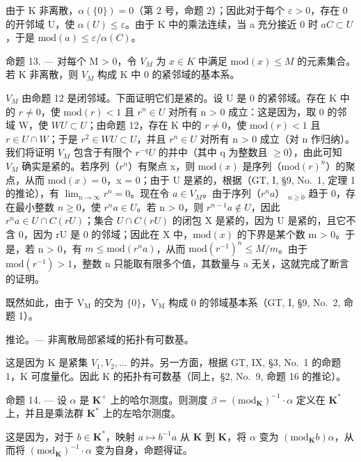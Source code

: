 由于 K 非离散，\(\alpha(\{0\}) = 0\)（第 2 号，命题 2）；因此对于每个 \(\varepsilon > 0\)，存在 0 的开邻域 U，使 \(\alpha(U) \leqslant \varepsilon\)。由于 K 中的乘法连续，当 a 充分接近 0 时 \(aC \subset U\)，于是 \(\text{mod}(a) \leqslant \varepsilon / \alpha(C)\)。

命题 13. --- 对每个 M \textgreater{} 0，令 \(V_{M}\) 为 \(x \in K\) 中满足 \(\text{mod}(x) \leqslant M\) 的元素集合。若 K 非离散，则 \(V_{M}\) 构成 K 中 0 的紧邻域的基本系。

\(V_{M}\) 由命题 12 是闭邻域。下面证明它们是紧的。设 U 是 0 的紧邻域。存在 K 中的 \(r \neq 0\)，使 \(\text{mod}(r) < 1\) 且 \(r^{n} \in U\) 对所有 n \textgreater{} 0 成立：这是因为，取 0 的邻域 W，使 \(WU \subset U\)；由命题 12，存在 K 中的 \(r \neq 0\)，使 \(\text{mod}(r) < 1\) 且 \(r \in U \cap W\)；于是 \(r^{2} \in WU \subset U\)，并且 \(r^{n} \in U\) 对所有 n \textgreater{} 0 成立（对 n 作归纳）。我们将证明 \(V_{M}\) 包含于有限个 \(r^{-q}U\) 的并中（其中 q 为整数且 \(\geqslant 0\)），由此可知 \(V_{M}\) 确实是紧的。若序列（\(r^{n}\)）有聚点 x，则 \(\text{mod}(x)\) 是序列（\(\text{mod}(r)^{n}\)）的聚点，从而 \(\text{mod}(x) = 0\)，x = 0；由于 U 是紧的，根据（GT, I, §9, No.~1, 定理 1 的推论），有 \(\lim_{n \to \infty} r^{n} = 0\)。现在令 \(a \in V_{M}\)。由于序列（\(r^{n}a\)） \(_{n \geqslant 0}\) 趋于 0，存在最小整数 \(n \geqslant 0\)，使 \(r^{n}a \in U\)。若 n \textgreater{} 0，则 \(r^{n-1}a \notin U\)，因此 \(r^{n}a \in U \cap C(rU)\)；集合 \(U \cap C(rU)\) 的闭包 X 是紧的，因为 U 是紧的，且它不含 0，因为 rU 是 0 的邻域；因此在 X 中，\(\text{mod}(x)\) 的下界是某个数 m \textgreater{} 0。于是，若 n \textgreater{} 0，有 \(m \leqslant \text{mod}(r^{n}a)\)，从而 \(\text{mod}(r^{-1})^{n} \leqslant M/m\)。由于 \(\text{mod}(r^{-1}) > 1\)，整数 n 只能取有限多个值，其数量与 a 无关，这就完成了断言的证明。

既然如此，由于 \(\mathrm{V_M}\) 的交为 \(\{0\}\)，\(\mathrm{V_M}\) 构成 0 的邻域基本系（GT, I, §9, No.~2, 命题 1）。

推论。--- 非离散局部紧域的拓扑有可数基。

这是因为 K 是紧集 \(V_{1}, V_{2}, \ldots\) 的并。另一方面，根据 GT, IX, §3, No.~1 的命题 1，K 可度量化。因此 K 的拓扑有可数基（同上，§2, No.~9, 命题 16 的推论）。

命题 14. --- 设 \(\alpha\) 是 \(\mathbf{K}^{+}\) 上的哈尔测度。则测度 \(\beta = (\mathrm{mod}_{\mathbf{K}})^{-1} \cdot \alpha\) 定义在 \(\mathbf{K}^{*}\) 上，并且是乘法群 \(\mathbf{K}^{*}\) 上的左哈尔测度。

这是因为，对于 \(b \in \mathbf{K}^*\)，映射 \(a \mapsto b^{-1}a\) 从 \(\mathbf{K}\) 到 \(\mathbf{K}\)，将 \(\alpha\) 变为 \((\mathrm{mod}_{\mathbf{K}}b)\alpha\)，从而将 \((\mathrm{mod}_{\mathbf{K}})^{-1} \cdot \alpha\) 变为自身，命题得证。

